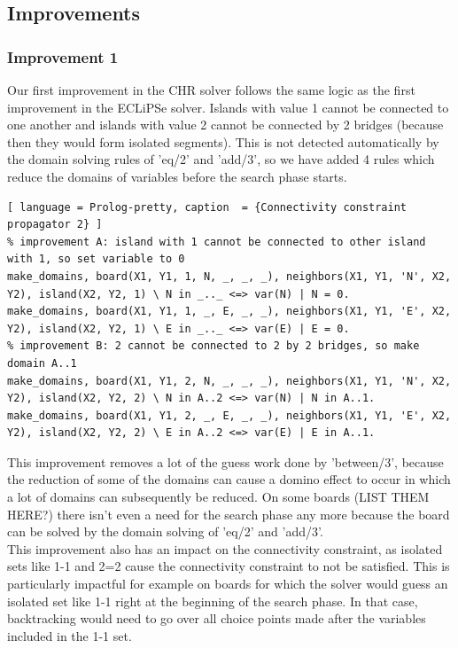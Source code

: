 \documentclass{report}
\begin{document}
\subsection{Improvements}
\subsubsection{Improvement 1}
Our first improvement in the CHR solver follows the same logic as the first improvement in the ECLiPSe solver. Islands with value 1 cannot be connected to one another and islands with value 2 cannot be connected by 2 bridges (because then they would form isolated segments). This is not detected automatically by the domain solving rules of 'eq/2' and 'add/3', so we have added 4 rules which reduce the domains of variables before the search phase starts.

\begin{lstlisting}[ language = Prolog-pretty, caption  = {Connectivity constraint propagator 2} ]
% improvement A: island with 1 cannot be connected to other island with 1, so set variable to 0
make_domains, board(X1, Y1, 1, N, _, _, _), neighbors(X1, Y1, 'N', X2, Y2), island(X2, Y2, 1) \ N in _.._ <=> var(N) | N = 0.
make_domains, board(X1, Y1, 1, _, E, _, _), neighbors(X1, Y1, 'E', X2, Y2), island(X2, Y2, 1) \ E in _.._ <=> var(E) | E = 0.
% improvement B: 2 cannot be connected to 2 by 2 bridges, so make domain A..1
make_domains, board(X1, Y1, 2, N, _, _, _), neighbors(X1, Y1, 'N', X2, Y2), island(X2, Y2, 2) \ N in A..2 <=> var(N) | N in A..1.
make_domains, board(X1, Y1, 2, _, E, _, _), neighbors(X1, Y1, 'E', X2, Y2), island(X2, Y2, 2) \ E in A..2 <=> var(E) | E in A..1.
\end{lstlisting}

This improvement removes a lot of the guess work done by 'between/3', because the reduction of some of the domains can cause a domino effect to occur in which a lot of domains can subsequently be reduced. On some boards (LIST THEM HERE?) there isn't even a need for the search phase any more because the board can be solved by the domain solving of 'eq/2' and 'add/3'. \\
This improvement also has an impact on the connectivity constraint, as isolated sets like 1-1 and 2=2 cause the connectivity constraint to not be satisfied. This is particularly impactful for example on boards for which the solver would guess an isolated set like 1-1 right at the beginning of the search phase. In that case, backtracking would need to go over all choice points made after the variables included in the 1-1 set.
\end{document}
